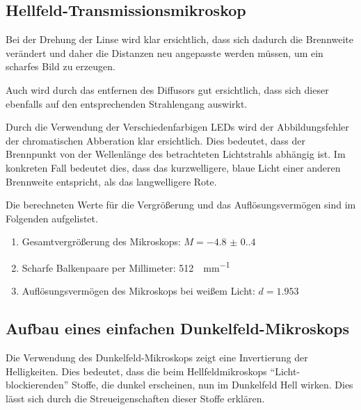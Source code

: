 \documentclass[12pt,english,ngerman]{scrartcl}
\begin{document}
\subsection{Hellfeld-Transmissionsmikroskop}

Bei der Drehung der Linse wird klar ersichtlich, dass sich dadurch die
Brennweite verändert und daher die Distanzen neu angepasste werden müssen, um
ein scharfes Bild zu erzeugen.

Auch wird durch das entfernen des Diffusors gut ersichtlich, dass sich dieser
ebenfalls auf den entsprechenden Strahlengang auswirkt.

Durch die Verwendung der Verschiedenfarbigen LEDs wird der Abbildungsfehler der
chromatischen Abberation klar ersichtlich. Dies bedeutet, dass der Brennpunkt
von der Wellenlänge des betrachteten Lichtstrahls abhängig ist. Im konkreten
Fall bedeutet dies, dass das kurzwelligere, blaue Licht einer anderen
Brennweite entspricht, als das langwelligere Rote.

Die berechneten Werte für die Vergrößerung und das Auflösungsvermögen sind im
Folgenden aufgelistet.

\begin{enumerate}
	\item Gesamtvergrößerung des Mikroskops: $M = \num{-4.8(0.4)}$
	\item Scharfe Balkenpaare per Millimeter: \SI{512}{\strich\per\mm}
	\item Auflösungsvermögen des Mikroskops bei weißem Licht: $d = \num{1.953}$
\end{enumerate}

\subsection{Aufbau eines einfachen Dunkelfeld-Mikroskops}

Die Verwendung des Dunkelfeld-Mikroskops zeigt eine Invertierung der
Helligkeiten. Dies bedeutet, dass die beim Hellfeldmikroskops
``Licht-blockierenden'' Stoffe, die dunkel erscheinen, nun im Dunkelfeld Hell
wirken. Dies lässt sich durch die Streueigenschaften dieser Stoffe erklären.

\newpage
\printbibliography
\listoffigures
\listoftables
\end{document}
